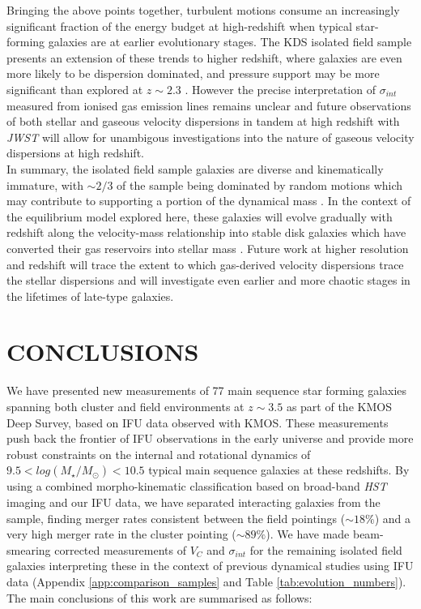 \documentclass[fleqn,usenatbib]{mn2e}
\begin{document}
Bringing the above points together, turbulent motions consume an increasingly significant fraction of the energy budget at high-redshift when typical star-forming galaxies are at earlier evolutionary stages.
The KDS isolated field sample presents an extension of these trends to higher redshift, where galaxies are even more likely to be dispersion dominated, and pressure support may be more significant than explored at $z\sim2.3$ \citep{Wuyts2016b,Ubler2017,Genzel2017,Lang2017}.    
However the precise interpretation of $\sigma_{int}$ measured from ionised gas emission lines remains unclear and future observations of both stellar and gaseous velocity dispersions in tandem at high redshift with {\it JWST} will allow for unambigous investigations into the nature of gaseous velocity dispersions at high redshift. \\

In summary, the isolated field sample galaxies are diverse and kinematically immature, with $\sim2/3$ of the sample being dominated by random motions which may contribute to supporting a portion of the dynamical mass \citep[e.g.][]{Kassin2007,Burkert2010,Kassin2012,Newman2013,Straatman2017,Ubler2017,Lang2017}.
In the context of the equilibrium model explored here, these galaxies will evolve gradually with redshift along the velocity-mass relationship into stable disk galaxies which have converted their gas reservoirs into stellar mass \citep[e.g.][]{Lilly2013,Tacconi2013,Wisnioski2015,Tacconi2017}. 
Future work at higher resolution and redshift will trace the extent to which gas-derived velocity dispersions trace the stellar dispersions and will investigate even earlier and more chaotic stages in the lifetimes of late-type galaxies.

\section{CONCLUSIONS}\label{sec:conclusion}
We have presented new measurements of 77 main sequence star forming galaxies spanning both cluster and field environments at $z\sim3.5$ as part of the KMOS Deep Survey, based on IFU data observed with KMOS.
These measurements push back the frontier of IFU observations in the early universe and provide more robust constraints on the internal and rotational dynamics of $9.5 < log(M_{\star}/M_{\odot})< 10.5$ typical main sequence galaxies at these redshifts.
By using a combined morpho-kinematic classification based on broad-band {\em HST} imaging and our IFU data, we have separated interacting galaxies from the sample, finding merger rates consistent between the field pointings ($\sim18\%$) and a very high merger rate in the cluster pointing ($\sim89\%$).
We have made beam-smearing corrected measurements of $V_{C}$ and $\sigma_{int}$ for the remaining isolated field galaxies interpreting these in the context of previous dynamical studies using IFU data (Appendix \ref{app:comparison_samples} and Table \ref{tab:evolution_numbers}).
The main conclusions of this work are summarised as follows:
\end{document}
